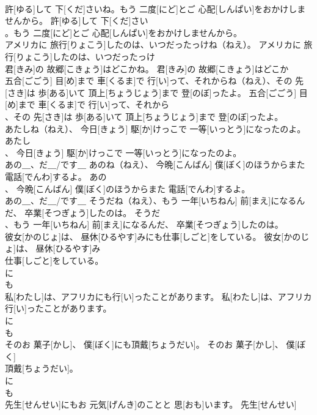 \documentclass[8pt]{extreport}
\begin{document}
\begin{CJK}{UTF8}{min}
\\	許[ゆる]して 下[くだ]さいね。もう 二度[にど]とご 心配[しんぱい]をおかけしませんから。	許[ゆる]して 下[くだ]さい
\\	。もう 二度[にど]とご 心配[しんぱい]をおかけしませんから。	
\\	アメリカに 旅行[りょこう]したのは、いつだったっけね（ねえ）。	アメリカに 旅行[りょこう]したのは、いつだったっけ
\\	君[きみ]の 故郷[こきょう]はどこかね。	君[きみ]の 故郷[こきょう]はどこか
\\	五合[ごごう] 目[め]まで 車[くるま]で 行[い]って、それからね（ねえ）、その 先[さき]は 歩[ある]いて 頂上[ちょうじょう]まで 登[のぼ]ったよ。	五合[ごごう] 目[め]まで 車[くるま]で 行[い]って、それから
\\	、その 先[さき]は 歩[ある]いて 頂上[ちょうじょう]まで 登[のぼ]ったよ。	
\\	あたしね（ねえ）、 今日[きょう] 駆[か]けっこで 一等[いっとう]になったのよ。	あたし
\\	、 今日[きょう] 駆[か]けっこで 一等[いっとう]になったのよ。	
\\	あの＿、だ＿/です＿	あのね（ねえ）、 今晩[こんばん] 僕[ぼく]のほうからまた 電話[でんわ]するよ。	あの
\\	、 今晩[こんばん] 僕[ぼく]のほうからまた 電話[でんわ]するよ。	
\\	あの＿、だ＿/です＿	そうだね（ねえ）、もう 一年[いちねん] 前[まえ]になるんだ、 卒業[そつぎょう]したのは。	そうだ
\\	、もう 一年[いちねん] 前[まえ]になるんだ、 卒業[そつぎょう]したのは。	
\\	彼女[かのじょ]は、 昼休[ひるやす]みにも仕事[しごと]をしている。	彼女[かのじょ]は、 昼休[ひるやす]み
\\	仕事[しごと]をしている。	
\\	に 
\\	も 
\\	私[わたし]は、アフリカにも行[い]ったことがあります。	私[わたし]は、アフリカ
\\	行[い]ったことがあります。	
\\	に 
\\	も 
\\	そのお 菓子[かし]、 僕[ぼく]にも頂戴[ちょうだい]。	そのお 菓子[かし]、 僕[ぼく]
\\	頂戴[ちょうだい]。	
\\	に 
\\	も 
\\	先生[せんせい]にもお 元気[げんき]のことと 思[おも]います。	先生[せんせい]

\end{CJK}
\end{document}
